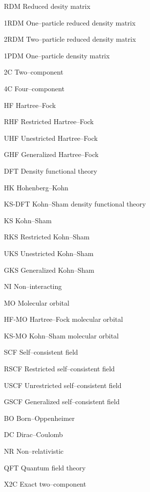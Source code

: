 \begin{glossary}
  \item[RDM]         Reduced desity matrix
  \item[1RDM]        One--particle reduced density matrix
  \item[2RDM]        Two--particle reduced density matrix
  \item[1PDM]        One--particle density matrix
  \item[2C]          Two--component
  \item[4C]          Four--component
  \item[HF]          Hartree--Fock
  \item[RHF]         Restricted Hartree--Fock
  \item[UHF]         Unestricted Hartree--Fock
  \item[GHF]         Generalized Hartree--Fock
  \item[DFT]         Density functional theory
  \item[HK]          Hohenberg--Kohn
  \item[KS-DFT]      Kohn--Sham density functional theory
  \item[KS]          Kohn--Sham
  \item[RKS]         Restricted Kohn--Sham
  \item[UKS]         Unestricted Kohn--Sham
  \item[GKS]         Generalized Kohn--Sham
  \item[NI]          Non--interacting
  \item[MO]          Molecular orbital
  \item[HF-MO]       Hartree--Fock   molecular orbital
  \item[KS-MO]       Kohn--Sham   molecular orbital
  \item[SCF]         Self--consistent field
  \item[RSCF]        Restricted self--consistent field
  \item[USCF]        Unrestricted self--consistent field
  \item[GSCF]        Generalized self--consistent field
  \item[BO]          Born--Oppenheimer
  \item[DC]          Dirac--Coulomb
  \item[NR]          Non--relativistic
  \item[QFT]         Quantum field theory
  \item[X2C]         Exact two--component

\end{glossary}
